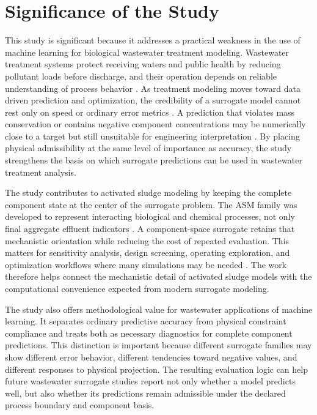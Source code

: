 \documentclass[12pt, twoside]{book}
\begin{document}
\section{Significance of the Study}

This study is significant because it addresses a practical weakness in the use of machine learning for
biological wastewater treatment modeling. Wastewater treatment systems protect receiving waters and public
health by reducing pollutant loads before discharge, and their operation depends on reliable understanding of
process behavior \citep{Lin2022,Madhav2019}. As treatment modeling moves toward data driven prediction and
optimization, the credibility of a surrogate model cannot rest only on speed or ordinary error metrics
\citep{Asadi2017,Fang2011,Sadeghassadi2018,Croll2023}. A prediction that violates mass conservation or
contains negative component concentrations may be numerically close to a target but still unsuitable for
engineering interpretation \citep{Hansen2024,KircherVotsmeier2025,Shen2023}. By placing physical
admissibility at the same level of importance as accuracy, the study strengthens the basis on which surrogate
predictions can be used in wastewater treatment analysis.

The study contributes to activated sludge modeling by keeping the complete component state at the center of the
surrogate problem. The ASM family was developed to represent interacting biological and chemical processes,
not only final aggregate effluent indicators \citep{Henze1999,Henze2006}. A component-space surrogate retains
that mechanistic orientation while reducing the cost of repeated evaluation. This matters for sensitivity
analysis, design screening, operating exploration, and optimization workflows where many simulations may be
needed \citep{Araujo2013,Aboagye2021,PadronPaez2020,Durkin2024}. The work therefore helps connect the
mechanistic detail of activated sludge models with the computational convenience expected from modern
surrogate modeling.

The study also offers methodological value for wastewater applications of machine learning. It separates
ordinary predictive accuracy from physical constraint compliance and treats both as necessary diagnostics for
complete component predictions. This distinction is important because different surrogate families may show
different error behavior, different tendencies toward negative values, and different responses to physical
projection. The resulting evaluation logic can help future wastewater surrogate studies report not only
whether a model predicts well, but also whether its predictions remain admissible under the declared process
boundary and component basis.
\end{document}
